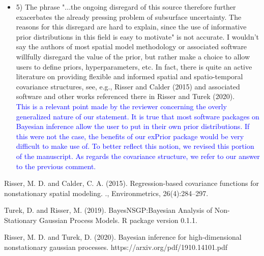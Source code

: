 \documentclass{article}
\begin{document}
\begin{itemize}
    \item 5) The phrase "...the ongoing disregard of this source therefore further exacerbates the already pressing problem of subsurface uncertainty. The reasons for this disregard are hard to explain, since the use of informative prior distributions in this field is easy to motivate" is not accurate. I wouldn't say the authors of most spatial model methodology or associated software willfully disregard the value of the prior, but rather make a choice to allow users to define priors, hyperparameters, etc. In fact, there is quite an active literature on providing flexible and informed spatial and spatio-temporal covariance structures, see, e.g., Risser and Calder (2015) and associated software and other works referenced there in Risser and Turek (2020).\\
    \textcolor{blue}{This is a relevant point made by the reviewer concerning the overly generalized nature of our statement. It is true that most software packages on Bayesian inference allow the user to put in their own prior distributions. If this were not the case, the benefits of our exPrior package would be very difficult to make use of. To better reflect this notion, we revised this portion of the manuscript. As regards the covariance structure, we refer to our answer to the previous comment.}
\end{itemize}



Risser, M. D. and Calder, C. A. (2015).  Regression-based covariance functions for nonstationary spatial modeling.  ., Environmetrics, 26(4):284--297.

Turek, D. and Risser, M. (2019). BayesNSGP:Bayesian Analysis of Non-Stationary Gaussian Process Models.  R package version 0.1.1.

Risser, M. D. and Turek, D. (2020). Bayesian inference for high-dimensional nonstationary gaussian processes. https://arxiv.org/pdf/1910.14101.pdf
\end{document}
